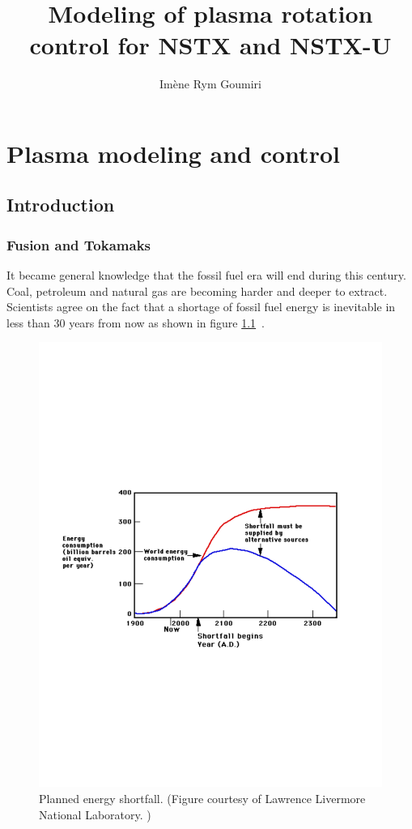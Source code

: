 \documentclass[12pt,lot, lof]{puthesis}
\title{Modeling of plasma rotation control for NSTX and NSTX-U}
\author{Im\`ene Rym Goumiri}
\begin{document}
\makefrontmatter


%
\part{Plasma modeling and control}
\chapter{Introduction}

\section{Fusion and Tokamaks}

It became general knowledge that the fossil fuel era will end during this century. Coal, petroleum and natural gas are becoming harder and deeper to extract. Scientists agree on the fact that a shortage of fossil fuel energy is inevitable in less than 30 years from now as shown in figure \ref{projected_energy_shortfall}~\cite{GIEC}.

\begin{figure}
\centering
\includegraphics[width=\linewidth]{projected_energy_shortfall.pdf}
\caption{Planned energy shortfall. (Figure courtesy of Lawrence Livermore National Laboratory. \cite{GIEC})}
\label{projected_energy_shortfall}
\end{figure}
\end{document}
